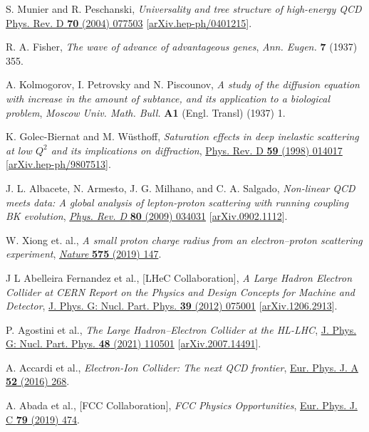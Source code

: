 \documentclass[12pt]{article}
\begin{document}
\begin{thebibliography}{99}
S. Munier and R. Peschanski, \emph{Universality and tree structure of high-energy QCD} \href{https://doi.org/10.1103/PhysRevD.70.077503}{Phys. Rev. D {\bf70} (2004) 077503} [\href{https://doi.org/10.48550/arXiv.hep-ph/0401215}{arXiv.hep-ph/0401215}].

R. A. Fisher, \emph{The wave of advance of advantageous genes}, \emph{Ann. Eugen.} {\bf 7} (1937) 355.

A. Kolmogorov, I. Petrovsky and N. Piscounov, \emph{A study of the diffusion equation with increase in the amount of subtance, and its application to a biological problem}, \emph{Moscow Univ. Math. Bull.} {\bf A1} (Engl. Transl) (1937) 1.

K. Golec-Biernat and M. Wüsthoff, \emph{Saturation effects in deep inelastic scattering at low $Q^2$ and its implications on diffraction}, \href{https://doi.org/10.1103/PhysRevD.59.014017}{Phys. Rev. D {\bf59} (1998) 014017} [\href{https://doi.org/10.48550/arXiv.hep-ph/9807513}{arXiv.hep-ph/9807513}].

J. L. Albacete, N. Armesto, J. G. Milhano, and C. A. Salgado, \emph{Non-linear QCD meets data: A global analysis of lepton-proton scattering with running coupling BK evolution}, \href{https://doi.org/10.1103/PhysRevD.80.034031}{\emph{Phys. Rev. D} {\bf 80} (2009) 034031}
[\href{https://doi.org/10.48550/arXiv.0902.1112}{arXiv.0902.1112}].

W. Xiong et. al., \emph{A small proton charge radius from an electron–proton scattering experiment}, \href{https://doi.org/10.1038/s41586-019-1721-2}{\emph{Nature} {\bf 575} (2019) 147}.

J L Abelleira Fernandez et al., [LHeC Collaboration], \emph{A Large Hadron Electron Collider at CERN Report on the Physics and Design Concepts for Machine and Detector}, \href{https://iopscience.iop.org/article/10.1088/0954-3899/39/7/075001}{J. Phys. G: Nucl. Part. Phys. {\bf39} (2012) 075001} [\href{https://arxiv.org/abs/1206.2913}{arXiv.1206.2913}].

P. Agostini et al., \emph{The Large Hadron–Electron Collider at the HL-LHC}, \href{https://iopscience.iop.org/article/10.1088/1361-6471/abf3ba}{ J. Phys. G: Nucl. Part. Phys. {\bf48} (2021) 110501} [\href{https://doi.org/10.48550/arXiv.2007.14491}{arXiv.2007.14491}].

A. Accardi et al., \emph{Electron-Ion Collider: The next QCD frontier}, \href{https://doi.org/10.1140/epja/i2016-16268-9}{Eur. Phys. J. A {\bf52} (2016) 268}.

A. Abada et al., [FCC Collaboration], \emph{FCC Physics Opportunities}, \href{https://doi.org/10.1140/epjc/s10052-019-6904-3}{Eur. Phys. J. C {\bf79} (2019) 474}.
	
\end{thebibliography}
	
\end{document}
